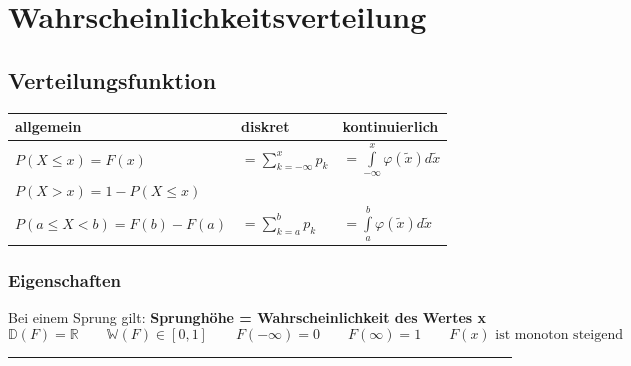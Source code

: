 \section{Wahrscheinlichkeitsverteilung}

	\subsection{Verteilungsfunktion }
		\begin{tabular}[]{|l|l|l|}
        	\hline
        	\textbf{allgemein} & \textbf{diskret} & \textbf{kontinuierlich}\\
        	\hline
        	\hline
        	$P(X\leq x)=F(x)$ & $=\sum\limits_{k=-\infty}^x p_k$ &
        	$=\int\limits_{-\infty}^x \varphi(\tilde{x})d\tilde{x}$\\
          
          $P(X>x)=1-P(X\leq x)$ & & \\        	
        	$P(a \le X < b)=F(b)-F(a)$ & $=\sum\limits_{k=a}^b p_k$ &
          $=\int \limits_a^b \varphi(\tilde{x})d\tilde{x}$\\
        	\hline
        \end{tabular}

		\subsubsection{Eigenschaften}
          Bei einem Sprung gilt: \textbf{Sprunghöhe = Wahrscheinlichkeit des Wertes x}\\
  				$$\boxed{\mathbb{D}(F) = \mathbb{R}} \qquad \boxed{\mathbb{W}(F)
  				\in[0,1]} \qquad \boxed{F(-\infty)=0} \qquad  \boxed{F(\infty)=1}
  				\qquad \boxed{F(x) \text{ ist monoton steigend}}$$

\hrule

